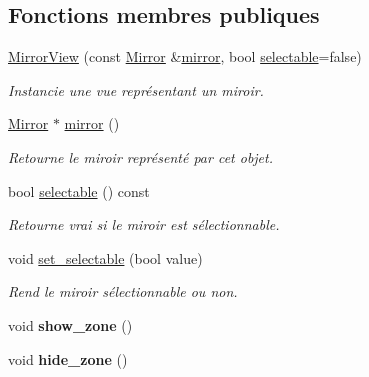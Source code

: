 \subsection*{Fonctions membres publiques}
\begin{DoxyCompactItemize}
\item 
\hyperlink{classMirrorView_a04dab41c29196186c918e60a1b2487b2}{Mirror\+View} (const \hyperlink{classMirror}{Mirror} \&\hyperlink{classMirrorView_a61c25961d7e140d5a8ff38aeb5ce8da2}{mirror}, bool \hyperlink{classMirrorView_ad52e5d438a1b61b135c2ca56cadcd090}{selectable}=false)
\begin{DoxyCompactList}\small\item\em Instancie une vue représentant un miroir. \end{DoxyCompactList}\item 
\hyperlink{classMirror}{Mirror} $\ast$ \hyperlink{classMirrorView_a61c25961d7e140d5a8ff38aeb5ce8da2}{mirror} ()
\begin{DoxyCompactList}\small\item\em Retourne le miroir représenté par cet objet. \end{DoxyCompactList}\item 
bool \hyperlink{classMirrorView_ad52e5d438a1b61b135c2ca56cadcd090}{selectable} () const 
\begin{DoxyCompactList}\small\item\em Retourne vrai si le miroir est sélectionnable. \end{DoxyCompactList}\item 
void \hyperlink{classMirrorView_a67fc521e337191818dba7c1abfbb6e84}{set\+\_\+selectable} (bool value)
\begin{DoxyCompactList}\small\item\em Rend le miroir sélectionnable ou non. \end{DoxyCompactList}\item 
\hypertarget{classMirrorView_ac9a758db6d2c5c99e1f5923a6248d296}{void {\bfseries show\+\_\+zone} ()}\label{classMirrorView_ac9a758db6d2c5c99e1f5923a6248d296}

\item 
\hypertarget{classMirrorView_a64fbd2447cb892fd6ffebf14a525c806}{void {\bfseries hide\+\_\+zone} ()}\label{classMirrorView_a64fbd2447cb892fd6ffebf14a525c806}


\end{DoxyCompactItemize}
